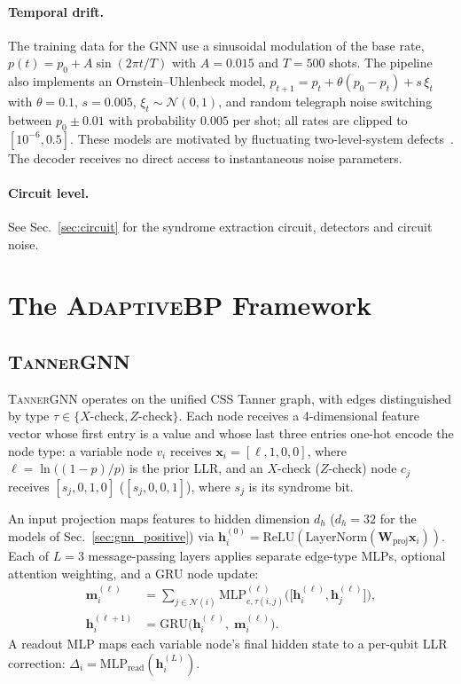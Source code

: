 \documentclass[a4paper,twocolumn,11pt,nopdfoutputerror]{quantumarticle}
\newcommand{\Wmat}{\mathbf{W}}
\newcommand{\bvec}[1]{\mathbf{#1}}
\begin{document}
\paragraph{Temporal drift.} The training data for the GNN use a
sinusoidal modulation of the base rate, $p(t)=p_0+A\sin(2\pi t/T)$ with
$A=0.015$ and $T=500$ shots. The pipeline also implements an
Ornstein--Uhlenbeck model, $p_{t+1}=p_t+\theta(p_0-p_t)+s\,\xi_t$ with
$\theta=0.1$, $s=0.005$, $\xi_t\sim\mathcal N(0,1)$, and random telegraph
noise switching between $p_0\pm0.01$ with probability $0.005$ per shot;
all rates are clipped to $[10^{-6},0.5]$. These models are motivated by
fluctuating two-level-system defects~\cite{Klimov2018,Carroll2022}. The
decoder receives no direct access to instantaneous noise parameters.

\paragraph{Circuit level.} See Sec.~\ref{sec:circuit} for the syndrome
extraction circuit, detectors and circuit noise.

\section{The \textsc{AdaptiveBP} Framework}\label{sec:methods}

\subsection{\textsc{TannerGNN}}\label{sec:tannergnn}

\textsc{TannerGNN} operates on the unified CSS Tanner graph, with
edges distinguished by type $\tau \in \{X\text{-check},Z\text{-check}\}$.
Each node receives a 4-dimensional feature vector whose first entry is
a value and whose last three entries one-hot encode the node type: a
variable node $v_i$ receives $\bvec{x}_i=[\ell,1,0,0]$, where
$\ell=\ln\bigl((1-p)/p\bigr)$ is the prior LLR, and an $X$-check
($Z$-check) node $c_j$ receives $[s_j,0,1,0]$ ($[s_j,0,0,1]$), where
$s_j$ is its syndrome bit.

An input projection maps features to hidden dimension $d_h$ ($d_h=32$ for
the models of Sec.~\ref{sec:gnn_positive}) via
$\bvec{h}_i^{(0)} = \mathrm{ReLU}(\mathrm{LayerNorm}(\Wmat_\mathrm{proj}\bvec{x}_i))$.
Each of $L = 3$ message-passing layers applies separate edge-type
MLPs, optional attention weighting, and a GRU node update:
\begin{align}
\bvec{m}_i^{(\ell)} &= \sum_{j\in\mathcal{N}(i)}
  \mathrm{MLP}_{e,\tau(i,j)}^{(\ell)}\!\bigl(\bigl[\bvec{h}_i^{(\ell)},\bvec{h}_j^{(\ell)}\bigr]\bigr),
  \label{eq:msg}\\
\bvec{h}_i^{(\ell+1)} &= \mathrm{GRU}\!\bigl(\bvec{h}_i^{(\ell)},\;
  \bvec{m}_i^{(\ell)}\bigr).
  \label{eq:gru}
\end{align}
A readout MLP maps each variable node's final hidden state to a
per-qubit LLR correction: $\Delta_i = \mathrm{MLP}_\mathrm{read}(\bvec{h}_i^{(L)})$.
\end{document}
